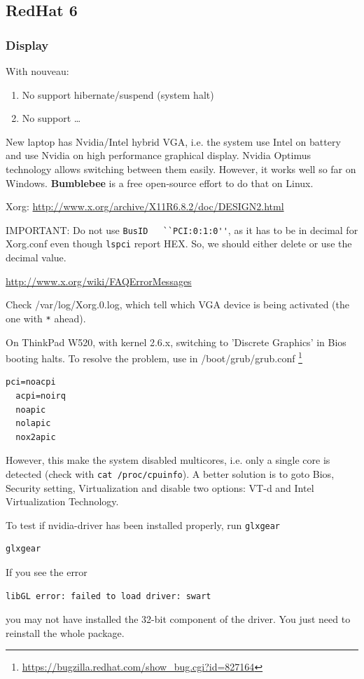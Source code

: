 \subsection{RedHat 6}

\subsubsection{Display}

With nouveau:
\begin{enumerate}
  \item No support hibernate/suspend (system halt)
  \item No support \ldots 
\end{enumerate}

New laptop has Nvidia/Intel hybrid VGA, i.e. the system use Intel on battery and
use Nvidia on high performance graphical display. Nvidia Optimus technology
allows switching between them easily. However, it works well so far on Windows.
{\bf Bumblebee} is a free open-source effort to do that on Linux. 

Xorg: \url{http://www.x.org/archive/X11R6.8.2/doc/DESIGN2.html}


IMPORTANT: Do not use \verb!BusID   ``PCI:0:1:0''!, as it has to be in decimal
for Xorg.conf even though \verb!lspci! report HEX. So, we should either delete
or use the decimal value.

\url{http://www.x.org/wiki/FAQErrorMessages}

Check /var/log/Xorg.0.log, which tell which VGA device is being activated (the
one with \verb!*! ahead). 


On ThinkPad W520, with kernel 2.6.x, switching to 'Discrete Graphics' in Bios
booting halts. To resolve the problem, use in /boot/grub/grub.conf
\footnote{\url{https://bugzilla.redhat.com/show_bug.cgi?id=827164}}
\begin{verbatim}
pci=noacpi
  acpi=noirq
  noapic
  nolapic
  nox2apic
\end{verbatim}
However, this make the system disabled multicores, i.e. only a single core is
detected (check with \verb!cat /proc/cpuinfo!). A better solution is to goto
Bios, Security setting, Virtualization and disable two options: VT-d and Intel
Virtualization Technology. 

To test if nvidia-driver has been installed properly, run \verb!glxgear!
\begin{verbatim}
glxgear
\end{verbatim}
If you see the error
\begin{verbatim}
libGL error: failed to load driver: swart
\end{verbatim}
you may not have installed the 32-bit component of the driver. You just
need to reinstall the whole package.

